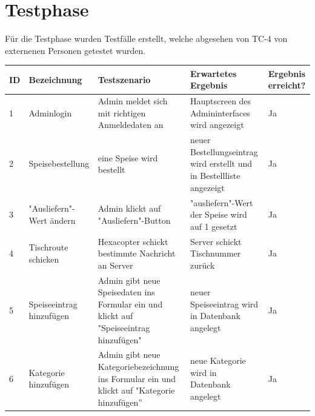 \section{Testphase}
Für die Testphase wurden Testfälle erstellt, welche abgesehen von TC-4 von externenen Personen getestet wurden.

\begin{table}[H]
\centering
\begin{tabular}{|p{0.5cm}|p{3cm}|p{4.5cm}|p{4cm}|p{2cm}|} 
\hline \textbf{ID} & \textbf{Bezeichnung} & \textbf{Testszenario} & \textbf{Erwartetes Ergebnis} & \textbf{Ergebnis erreicht?} \\\hline
\hline 1 & Adminlogin & Admin meldet sich mit \newline richtigen Anmeldedaten \newline an & Hauptscreen des \newline Admininterfaces wird \newline angezeigt & Ja \\\hline
\hline 2 & Speisebestellung & eine Speise wird bestellt & neuer Bestellungseintrag wird erstellt und in \newline Bestellliste angezeigt & Ja \\\hline
\hline 3 & "Ausliefern"-Wert \newline ändern & Admin klickt auf "Ausliefern"-Button & "ausliefern"-Wert der Speise wird auf 1 gesetzt & Ja \\\hline
\hline 4 & Tischroute \newline schicken & Hexacopter schickt \newline bestimmte Nachricht an Server & Server schickt \newline Tischnummer zurück & Ja \\\hline
\hline 5 & Speiseeintrag \newline hinzufügen & Admin gibt neue \newline Speisedaten ins Formular ein und klickt auf \newline "Speiseeintrag hinzufügen" & neuer Speiseeintrag wird in Datenbank angelegt & Ja \\\hline
\hline 6 & Kategorie \newline hinzufügen & Admin gibt neue \newline Kategoriebezeichnung ins \newline Formular ein und klickt auf \newline "Kategorie hinzufügen” & neue Kategorie wird in Datenbank angelegt & Ja \\\hline

\end{tabular}
\end{table}
